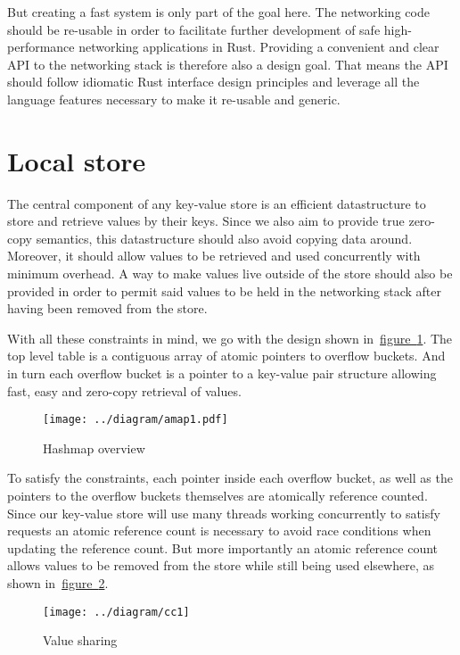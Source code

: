 \documentclass[11pt]{book}
\begin{document}
But creating a fast system is only part of the goal here. The
networking code should be re-usable in order to facilitate further
development of safe high-performance networking
applications in Rust. Providing a convenient and clear API to the
networking stack is therefore also a design goal. That means the API
should follow idiomatic Rust interface design principles and leverage
all the language features necessary to make it re-usable and generic.

\section{Local store} \label{sec:local-store-design}

The central component of any key-value store is an efficient
datastructure to store and retrieve values by their keys. Since we
also aim to provide true zero-copy semantics, this datastructure
should also avoid copying data around. Moreover, it should allow
values to be retrieved and used concurrently with minimum overhead.
A way to make values live outside of the store should also be provided
in order to permit said values to be held in the networking stack
after having been removed from the store.

With all these constraints in mind, we go with the design shown
in~\hyperref[fig:hashmap]{figure~\ref{fig:hashmap}}. The top level
table is a contiguous array of atomic pointers to overflow
buckets. And in turn each overflow bucket is a pointer to a key-value
pair structure allowing fast, easy and zero-copy retrieval of values.

\begin{figure}[htb!]
  \texttt{[image: ../diagram/amap1.pdf]}
  \caption{Hashmap overview}
  \label{fig:hashmap}
\end{figure}

To satisfy the constraints, each pointer inside each overflow bucket,
as well as the pointers to the overflow buckets themselves are
atomically reference counted. Since our key-value store will use many
threads working concurrently to satisfy requests an atomic reference
count is necessary to avoid race conditions when updating the
reference count. But more importantly an atomic reference count allows
values to be removed from the store while still being used elsewhere,
as shown
in~\hyperref[fig:value-sharing]{figure~\ref{fig:value-sharing}}.

\begin{figure}[htb!]
  \texttt{[image: ../diagram/cc1]}
  \caption{Value sharing}
  \label{fig:value-sharing}
\end{figure}
\end{document}
